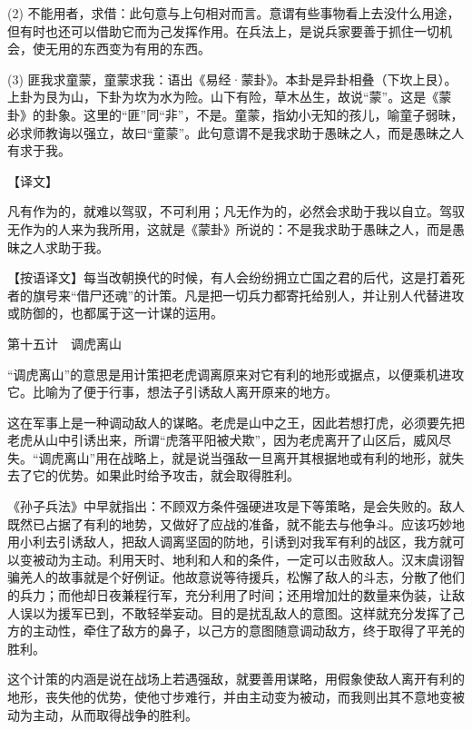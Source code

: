 \documentclass[12pt,UTF8]{ctexbook}
\begin{document}
(2) 不能用者，求借：此句意与上句相对而言。意谓有些事物看上去没什么用途，但有时也还可以借助它而为己发挥作用。在兵法上，是说兵家要善于抓住一切机会，使无用的东西变为有用的东西。

(3) 匪我求童蒙，童蒙求我：语出《易经·蒙卦》。本卦是异卦相叠（下坎上艮）。上卦为艮为山，下卦为坎为水为险。山下有险，草木丛生，故说“蒙”。这是《蒙卦》的卦象。这里的“匪”同“非”，不是。童蒙，指幼小无知的孩儿，喻童子弱昧，必求师教诲以强立，故曰“童蒙”。此句意谓不是我求助于愚昧之人，而是愚昧之人有求于我。





【译文】


凡有作为的，就难以驾驭，不可利用；凡无作为的，必然会求助于我以自立。驾驭无作为的人来为我所用，这就是《蒙卦》所说的：不是我求助于愚昧之人，而是愚昧之人求助于我。

【按语译文】每当改朝换代的时候，有人会纷纷拥立亡国之君的后代，这是打着死者的旗号来“借尸还魂”的计策。凡是把一切兵力都寄托给别人，并让别人代替进攻或防御的，也都属于这一计谋的运用。





第十五计　调虎离山


“调虎离山”的意思是用计策把老虎调离原来对它有利的地形或据点，以便乘机进攻它。比喻为了便于行事，想法子引诱敌人离开原来的地方。

这在军事上是一种调动敌人的谋略。老虎是山中之王，因此若想打虎，必须要先把老虎从山中引诱出来，所谓“虎落平阳被犬欺”，因为老虎离开了山区后，威风尽失。“调虎离山”用在战略上，就是说当强敌一旦离开其根据地或有利的地形，就失去了它的优势。如果此时给予攻击，就会取得胜利。

《孙子兵法》中早就指出：不顾双方条件强硬进攻是下等策略，是会失败的。敌人既然已占据了有利的地势，又做好了应战的准备，就不能去与他争斗。应该巧妙地用小利去引诱敌人，把敌人调离坚固的防地，引诱到对我军有利的战区，我方就可以变被动为主动。利用天时、地利和人和的条件，一定可以击败敌人。汉末虞诩智骗羌人的故事就是个好例证。他故意说等待援兵，松懈了敌人的斗志，分散了他们的兵力；而他却日夜兼程行军，充分利用了时间；还用增加灶的数量来伪装，让敌人误以为援军已到，不敢轻举妄动。目的是扰乱敌人的意图。这样就充分发挥了己方的主动性，牵住了敌方的鼻子，以己方的意图随意调动敌方，终于取得了平羌的胜利。

这个计策的内涵是说在战场上若遇强敌，就要善用谋略，用假象使敌人离开有利的地形，丧失他的优势，使他寸步难行，并由主动变为被动，而我则出其不意地变被动为主动，从而取得战争的胜利。
\end{document}
